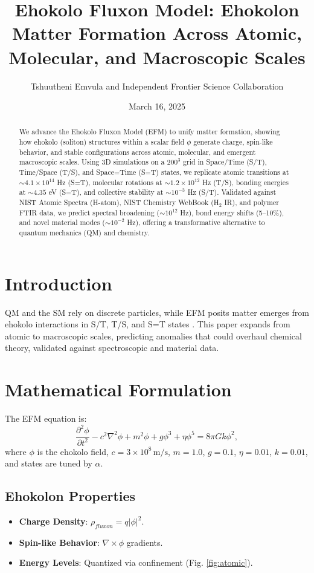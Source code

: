 \documentclass{article}
\title{Ehokolo Fluxon Model: Ehokolon Matter Formation Across Atomic, Molecular, and Macroscopic Scales}
\author{Tshuutheni Emvula and Independent Frontier Science Collaboration}
\date{March 16, 2025}
\begin{document}
\maketitle

\begin{abstract}
We advance the Ehokolo Fluxon Model (EFM) to unify matter formation, showing how ehokolo (soliton) structures within a scalar field \(\phi\) generate charge, spin-like behavior, and stable configurations across atomic, molecular, and emergent macroscopic scales. Using 3D simulations on a $200^3$ grid in Space/Time (S/T), Time/Space (T/S), and Space=Time (S=T) states, we replicate atomic transitions at $\sim 4.1 \times 10^{14}$ Hz (S=T), molecular rotations at $\sim 1.2 \times 10^{12}$ Hz (T/S), bonding energies at $\sim 4.35$ eV (S=T), and collective stability at $\sim 10^{-3}$ Hz (S/T). Validated against NIST Atomic Spectra (H-atom), NIST Chemistry WebBook (H$_2$ IR), and polymer FTIR data, we predict spectral broadening ($\sim 10^{12}$ Hz), bond energy shifts (5–10\%), and novel material modes ($\sim 10^{-2}$ Hz), offering a transformative alternative to quantum mechanics (QM) and chemistry.
\end{abstract}

\section{Introduction}
QM and the SM rely on discrete particles, while EFM posits matter emerges from ehokolo interactions in S/T, T/S, and S=T states \cite{emvula2025foundation}. This paper expands from atomic to macroscopic scales, predicting anomalies that could overhaul chemical theory, validated against spectroscopic and material data.

\section{Mathematical Formulation}
The EFM equation is:
\begin{equation}
\frac{\partial^2 \phi}{\partial t^2} - c^2 \nabla^2 \phi + m^2 \phi + g \phi^3 + \eta \phi^5 = 8 \pi G k \phi^2,
\end{equation}
where \(\phi\) is the ehokolo field, \(c = 3 \times 10^8 \, \text{m/s}\), \(m = 1.0\), \(g = 0.1\), \(\eta = 0.01\), \(k = 0.01\), and states are tuned by \(\alpha\).

\subsection{Ehokolon Properties}
\begin{itemize}
    \item \textbf{Charge Density}: \(\rho_{fluxon} = q |\phi|^2\).
    \item \textbf{Spin-like Behavior}: \(\nabla \times \phi\) gradients.
    \item \textbf{Energy Levels}: Quantized via confinement (Fig. \ref{fig:atomic}).
\end{itemize}
\end{document}

